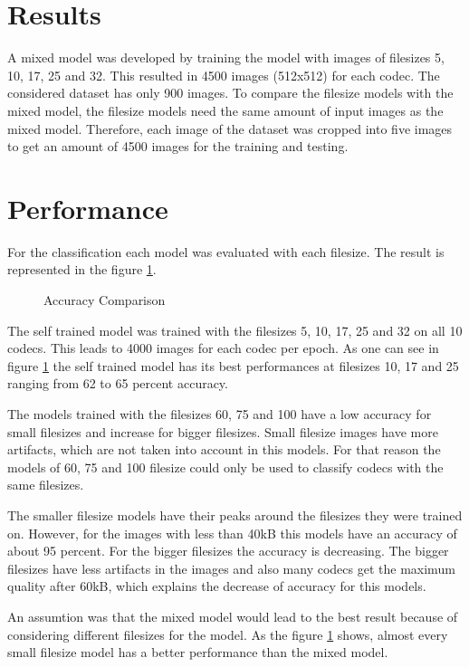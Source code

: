 \section{Results}
\label{Results}
A mixed model was developed by training the model with images of filesizes 5, 10, 17, 25 and 32. This resulted in 4500 images (512x512) for each codec. The considered dataset has only 900 images. To compare the filesize models with the mixed model, the filesize models need the same amount of input images as the mixed model. Therefore, each image of the dataset was cropped into five images to get an amount of 4500 images for the training and testing.

\section{Performance}
For the classification each model was evaluated with each filesize. The result is represented in the figure \ref{fig: acc_comparison}.

\begin{figure}[h!]
	\centering
	\resizebox{\textwidth}{!}{}
	\caption{Accuracy Comparison}
	\label{fig: acc_comparison}
\end{figure}

\noindent
The self trained model was trained with the filesizes 5, 10, 17, 25 and 32 on all 10 codecs. This leads to 4000 images for each codec per epoch. As one can see in figure \ref{fig: acc_comparison} the self trained model has its best performances at filesizes 10, 17 and 25 ranging from 62 to 65 percent accuracy.

\noindent
The models trained with the filesizes 60, 75 and 100 have a low accuracy for small filesizes and increase for bigger filesizes. Small filesize images have more artifacts, which are not taken into account in this models. For that reason the models of 60, 75 and 100 filesize could only be used to classify codecs with the same filesizes.

\noindent
The smaller filesize models have their peaks around the filesizes they were trained on. However, for the images with less than 40kB this models have an accuracy of about 95 percent. For the bigger filesizes the accuracy is decreasing. The bigger filesizes have less artifacts in the images and also many codecs get the maximum quality after 60kB, which explains the decrease of accuracy for this models.

\noindent
An assumtion was that the mixed model would lead to the best result because of considering different filesizes for the model. As the figure \ref{fig: acc_comparison} shows, almost every small filesize model has a better performance than the mixed model.

